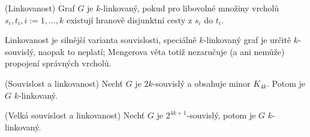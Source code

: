 \df (Linkovanost) Graf $G$ je $k$-linkovaný, pokud pro libovolné množiny
vrcholů $s_i, t_i, i := 1,\dots, k$ existují hranově disjunktní cesty z $s_i$
do $t_i$.

\pzn Linkovanost je silnější varianta souvislosti, speciálně $k$-linkovaný graf
je určitě $k$-souvislý, naopak to neplatí; Mengerova věta totiž nezaručuje (a
ani nemůže) propojení správných vrcholů.

\vt (Souvislost a linkovanost) Nechť $G$ je $2k$-souvislý a obsahuje minor
$K_{4k}$. Potom je $G$ $k$-linkovaný.

\vt (Velká souvislost a linkovanost) Nechť $G$ je $2^{4k+1}$-souvislý, potom je
$G$ $k$-linkovaný.



